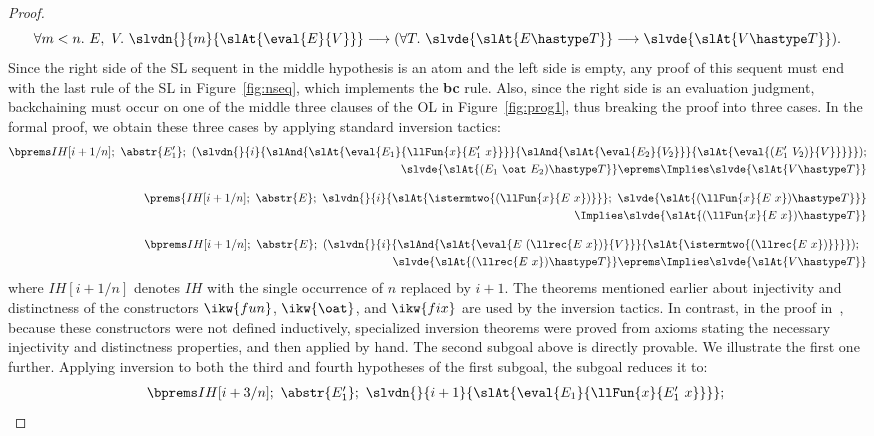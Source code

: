\documentclass[final]{svjour3}
\begin{document}
\begin{proof}
$$\forall m < n.\ E,\ V.\ \slvdn{}{m}{\slAt{\eval{E}{V}}} \longrightarrow
  (\forall T.\ 
\slvde{\slAt{E\hastype T}} \longrightarrow \slvde{\slAt{V\hastype
    T}}).$$
Since the right side of the SL sequent in the middle hypothesis is an
atom and the left side is
empty, any proof of this sequent must end with the last rule of the SL
in Figure~\ref{fig:nseq}, which implements the \textbf{bc} rule.
Also, since the right side is an evaluation judgment, backchaining
must occur on one of the middle three clauses of the OL in
Figure~\ref{fig:prog1}, thus breaking the proof into three cases.  In
the formal proof, we obtain these three cases by applying standard
inversion tactics:
\begin{eqnarray}\bprems IH[i+1/n];\,\,\abstr{E'_1};\,\,
 (\slvdn{}{i}
  {\slAnd{\slAt{\eval{E_1}{\llFun{x}{E'_1\ x}}}}
  {\slAnd{\slAt{\eval{E_2}{V_2}}}{\slAt{\eval{(E'_1\
	  V_2)}{V}}}}});\nonumber\\
\slvde{\slAt{(E_1\ \oat\ E_2)\hastype T}} \eprems
\Implies  \slvde{\slAt{V \hastype T}} \label{eq:appcase}\\[10pt]
\prems{IH[i+1/n];\,\,\abstr{E};\,\,
\slvdn{}{i}{\slAt{\istermtwo{(\llFun{x}{E\ x})}}};\,\,
\slvde{\slAt{(\llFun{x}{E\ x})\hastype T}}} \nonumber \\
\Implies \slvde{\slAt{(\llFun{x}{E\ x})\hastype T}}\nonumber \\[10pt]
\bprems IH[i+1/n];\,\,\abstr{E};\,\,
  (\slvdn{}{i}
   {\slAnd{\slAt{\eval{E\ (\llrec{E\ x})}{V}}}
          {\slAt{\istermtwo{(\llrec{E\ x})}}}});~~  \nonumber \\
  \slvde{\slAt{(\llrec{E \ x})\hastype T}} \eprems
\Implies  \slvde{\slAt{V \hastype T}} \nonumber
\end{eqnarray}
where $IH[i+1/n]$ denotes $IH$ with the single occurrence of $n$
replaced by $i+1$.  The theorems mentioned earlier about injectivity
and distinctness of the constructors $\ikw{fun}$, $\ikw{\oat}$,
and $\ikw{fix}$ are used by the inversion tactics.  In contrast, in
the proof in~\cite{Felty02}, because these constructors were not
defined inductively, specialized inversion theorems were proved from
axioms stating the necessary injectivity and distinctness properties,
and then applied by hand.  The second subgoal above is directly
provable.  We illustrate the first one further.
Applying inversion to both the third and fourth hypotheses
of the first subgoal, the subgoal reduces it to:
$$\begin{array}{rcl}
\bprems IH[i+3/n];\,\,\abstr{E'_1};\,\,
 \slvdn{}{i+1}{\slAt{\eval{E_1}{\llFun{x}{E'_1\ x}}}};\,\,

\end{array}$$
\end{proof}
\end{document}
